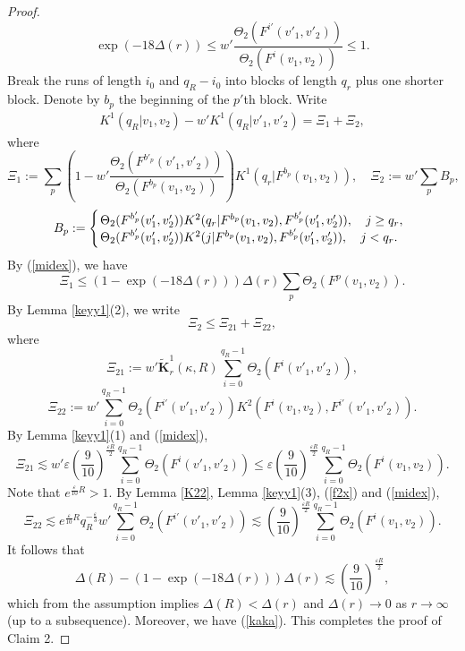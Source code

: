 \documentclass{amsart}
\theoremstyle{definition}
\begin{document}
\begin{proof}
\begin{equation}
\exp(-18\Delta(r))\leq w'\frac{\Theta_2(F^{i'}(v'_1,v'_2))}{\Theta_2(F^i(v_1,v_2))}\leq 1.
\end{equation}
Break the runs of length $i_0$ and $q_R-i_0$ into blocks of length $q_r$ plus one shorter block. Denote by $b_p$ the beginning of the $p'$th block. Write
\begin{equation}
\begin{split}
	K^1(q_R|v_1,v_2)-w'K^1(q_R|v'_1,v'_2)=\Xi_1+\Xi_2,
\end{split}
\end{equation}
where
\[ \Xi_1:=\sum_p\left(1-w'\frac{\Theta_2(F^{b'_p}(v'_1,v'_2))}{\Theta_2(F^{b_p}(v_1,v_2))}\right)K^1(q_r|F^{b_p}(v_1,v_2)),\quad \Xi_2:=w'\sum_pB_p,\]
\begin{equation}\label{BB}
B_p:=\left\{\begin{array}{ll}
	\hspace{-0.4em}\Theta_2(F^{b'_p}(v'_1,v'_2))K^2(q_r|F^{b_p}(v_1,v_2),F^{b'_p}(v'_1,v'_2)),\quad j\geq q_r,\\
	\hspace{-0.4em} \Theta_2(F^{b'_p}(v'_1,v'_2))K^2(j|F^{b_p}(v_1,v_2),F^{b'_p}(v'_1,v'_2)),\quad j<q_r.
\end{array}\right.
\end{equation}
By (\ref{midex}), we have
\[\Xi_1\leq (1-\exp(-18\Delta(r)))\Delta(r)\sum_p\Theta_2(F^p(v_1,v_2)).\]
By Lemma \ref{keyy1}(2), we write
\begin{equation}\label{lem6i}\Xi_2\leq \Xi_{21}+\Xi_{22},
\end{equation} where
\[\Xi_{21}:= w'\widetilde{\mathbf{K}}_{r}^1(\kappa,R)\sum_{i=0}^{q_R-1}\Theta_2(F^{i}(v'_1,v'_2)),\]
\[\Xi_{22}:= w'\sum_{i=0}^{q_R-1}\Theta_2(F^{i'}(v'_1,v'_2))K^2(F^{i}(v_1,v_2),F^{i'}(v'_1,v'_2)).\]
By Lemma \ref{keyy1}(1) and (\ref{midex}),
\[\Xi_{21}\lesssim w'\varepsilon(\frac{9}{10})^{\frac{\varepsilon R}{2}}\sum_{i=0}^{q_R-1}\Theta_2(F^{i}(v'_1,v'_2))\leq \varepsilon(\frac{9}{10})^{\frac{\varepsilon R}{2}}\sum_{i=0}^{q_R-1}\Theta_2(F^{i}(v_1,v_2)).\]
Note that $e^{\frac{\varepsilon}{10}R}>1$. By Lemma \ref{K22}, Lemma \ref{keyy1}(3),  (\ref{f2x}) and (\ref{midex}),
\[\Xi_{22}\lesssim e^{\frac{\varepsilon}{10}R}q_R^{-\frac{\varepsilon}{3}}w'\sum_{i=0}^{q_R-1}\Theta_2(F^{i'}(v'_1,v'_2))\lesssim (\frac{9}{10})^{\frac{\varepsilon R}{2}}\sum_{i=0}^{q_R-1}\Theta_2(F^{i}(v_1,v_2)).\]
It follows that
\[\Delta(R)-(1-\exp(-18\Delta(r)))\Delta(r)\lesssim (\frac{9}{10})^{\frac{\varepsilon R}{2}},\]
which from the assumption implies $\Delta(R)<\Delta(r)$ and $\Delta(r)\to 0$ as $r\to \infty$ (up to a subsequence). Moreover, we have (\ref{kaka}). This completes the proof of Claim 2.



\end{proof}
\end{document}
